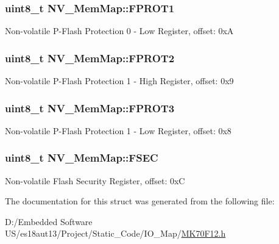 \subsubsection[{F\+P\+R\+O\+T1}]{\setlength{\rightskip}{0pt plus 5cm}uint8\+\_\+t N\+V\+\_\+\+Mem\+Map\+::\+F\+P\+R\+O\+T1}\label{struct_n_v___mem_map_a87204afdff32b371c03caafdf5a07b69}
Non-\/volatile P-\/\+Flash Protection 0 -\/ Low Register, offset\+: 0x\+A \hypertarget{struct_n_v___mem_map_aace11e44cee29095fe7c0bf683039f57}{}
\subsubsection[{F\+P\+R\+O\+T2}]{\setlength{\rightskip}{0pt plus 5cm}uint8\+\_\+t N\+V\+\_\+\+Mem\+Map\+::\+F\+P\+R\+O\+T2}\label{struct_n_v___mem_map_aace11e44cee29095fe7c0bf683039f57}
Non-\/volatile P-\/\+Flash Protection 1 -\/ High Register, offset\+: 0x9 \hypertarget{struct_n_v___mem_map_a944089b14b23cff0b4f8a16e13f8b9d6}{}
\subsubsection[{F\+P\+R\+O\+T3}]{\setlength{\rightskip}{0pt plus 5cm}uint8\+\_\+t N\+V\+\_\+\+Mem\+Map\+::\+F\+P\+R\+O\+T3}\label{struct_n_v___mem_map_a944089b14b23cff0b4f8a16e13f8b9d6}
Non-\/volatile P-\/\+Flash Protection 1 -\/ Low Register, offset\+: 0x8 \hypertarget{struct_n_v___mem_map_acb89fbc884fb10887ef063d1aa892b29}{}
\subsubsection[{F\+S\+E\+C}]{\setlength{\rightskip}{0pt plus 5cm}uint8\+\_\+t N\+V\+\_\+\+Mem\+Map\+::\+F\+S\+E\+C}\label{struct_n_v___mem_map_acb89fbc884fb10887ef063d1aa892b29}
Non-\/volatile Flash Security Register, offset\+: 0x\+C 

The documentation for this struct was generated from the following file\+:\begin{DoxyCompactItemize}
\item 
D\+:/\+Embedded Software U\+S/es18aut13/\+Project/\+Static\+\_\+\+Code/\+I\+O\+\_\+\+Map/\hyperlink{_m_k70_f12_8h}{M\+K70\+F12.\+h}\end{DoxyCompactItemize}

